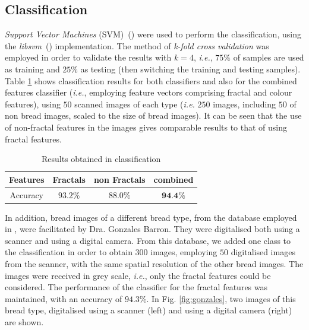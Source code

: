 \documentclass[oneside,a4paper,english,links]{amca}
\begin{document}
\subsection{Classification}
{\em Support Vector Machines} (SVM)~(\cite{Boser92}) were used to perform the classification, using the {\em libsvm}~(\cite{Chang2011}) implementation.
The method of {\em k-fold cross validation} was employed in order to validate the results with $k = 4$, {\em i.e.}, $75\%$ of samples are used as training and $25\%$ as testing (then switching the training and testing samples). Table \ref{table:tableFirstTest} shows classification results for both classifiers and also for the combined features classifier ({\em i.e.}, employing feature vectors comprising fractal and colour features), using $50$ scanned images of each type ({\em i.e.} $250$ images, including $50$ of non bread images, scaled to the size of bread images). It can be seen that the use of non-fractal features in the images gives comparable results to that of using fractal features.

\begin{table}[htb]
\centering
\begin{tabular}{|c|c|c|c|}
    \hline
    Features & Fractals & non Fractals & combined\\
    \hline
    \hline
    Accuracy  & $93.2\%$ & $88.0\%$ & $\textbf{94.4\%}$\\
    \hline
\end{tabular}
\caption{Results obtained in classification}
\label{table:tableFirstTest}
\end{table}

In addition, bread images of a different bread type, from the database employed in \cite{Gonzales2008}, were facilitated by Dra. Gonzales Barron. They were digitalised both using a scanner and using a digital camera. From this database, we added one class to the classification in order to obtain $300$ images, employing $50$ digitalised images from the scanner, with the same spatial resolution of the other bread images. The images were received in grey scale, {\em i.e.}, only the fractal features could be considered. The performance of the classifier for the fractal features was maintained, with an accuracy of $94.3\%$. In Fig. \ref{fig:gonzales}, two images of this bread type, digitalised using a scanner (left) and using a digital camera (right) are shown.
\end{document}
